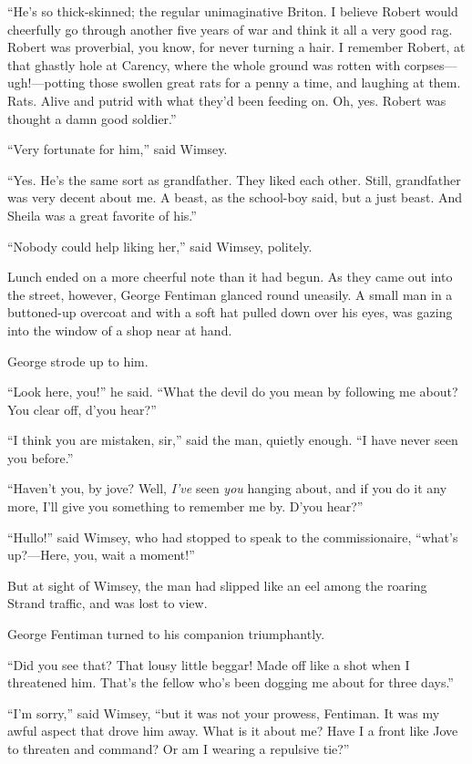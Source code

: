 \enquote{He's so thick-skinned; the regular unimaginative Briton. I believe Robert would cheerfully go through another five years of war and think it all a very good rag. Robert was proverbial, you know, for never turning a hair. I remember Robert, at that ghastly hole at Carency, where the whole ground was rotten with corpses\allowbreak---\allowbreak ugh!---potting those swollen great rats for a penny a time, and laughing at them. Rats. Alive and putrid with what they'd been feeding on. Oh, yes. Robert was thought a damn good soldier.}

\enquote{Very fortunate for him,} said Wimsey.

\enquote{Yes. He's the same sort as grandfather. They liked each other. Still, grandfather was very decent about me. A beast, as the school-boy said, but a just beast. And Sheila was a great favorite of his.}

\enquote{Nobody could help liking her,} said Wimsey, politely.

Lunch ended on a more cheerful note than it had begun. As they came out into the street, however, George Fentiman glanced round uneasily. A small man in a buttoned-up overcoat and with a soft hat pulled down over his eyes, was gazing into the window of a shop near at hand.

George strode up to him.

\enquote{Look here, you!} he said. \enquote{What the devil do you mean by following me about? You clear off, d'you hear?}

\enquote{I think you are mistaken, sir,} said the man, quietly enough. \enquote{I have never seen you before.}

\enquote{Haven't you, by jove? Well, \textit{I've} seen \textit{you} hanging about, and if you do it any more, I'll give you something to remember me by. D'you hear?}

\enquote{Hullo!} said Wimsey, who had stopped to speak to the commissionaire, \enquote{what's up?---Here, you, wait a moment!}

But at sight of Wimsey, the man had slipped like an eel among the roaring Strand traffic, and was lost to view.

George Fentiman turned to his companion triumphantly.

\enquote{Did you see that? That lousy little beggar! Made off like a shot when I threatened him. That's the fellow who's been dogging me about for three days.}

\enquote{I'm sorry,} said Wimsey, \enquote{but it was not your prowess, Fentiman. It was my awful aspect that drove him away. What is it about me? Have I a front like Jove to threaten and command? Or am I wearing a repulsive tie?}

